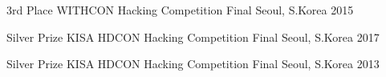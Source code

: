 \begin{cvhonors}

  \cvhonor
  {3rd Place} %
  {WITHCON Hacking Competition Final} %
  {Seoul, S.Korea} %
  {2015} %

  \cvhonor
  {Silver Prize} %
  {KISA HDCON Hacking Competition Final} %
  {Seoul, S.Korea} %
  {2017} %

  \cvhonor
  {Silver Prize} %
  {KISA HDCON Hacking Competition Final} %
  {Seoul, S.Korea} %
  {2013} %

\end{cvhonors}
